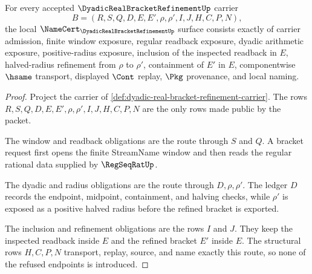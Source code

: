 \begin{theorem}
\label{thm:dyadic-real-bracket-refinement-namecert-obligations}
For every accepted $\DyadicRealBracketRefinementUp$ carrier
$$
B=(R,S,Q,D,E,E',\rho,\rho',I,J,H,C,P,N),
$$
the local $\NameCert_{\DyadicRealBracketRefinementUp}$ surface consists exactly of carrier admission, finite window exposure, regular readback exposure, dyadic arithmetic exposure, positive-radius exposure, inclusion of the inspected readback in $E$, halved-radius refinement from $\rho$ to $\rho'$, containment of $E'$ in $E$, componentwise $\hsame$ transport, displayed $\Cont$ replay, $\Pkg$ provenance, and local naming.
\end{theorem}
\begin{proof}
Project the carrier of \autoref{def:dyadic-real-bracket-refinement-carrier}. The rows $R,S,Q,D,E,E',\rho,\rho',I,J,H,C,P,N$ are the only rows made public by the packet.

The window and readback obligations are the route through $S$ and $Q$. A bracket request first opens the finite StreamName window and then reads the regular rational data supplied by $\RegSeqRatUp$.

The dyadic and radius obligations are the route through $D,\rho,\rho'$. The ledger $D$ records the endpoint, midpoint, containment, and halving checks, while $\rho'$ is exposed as a positive halved radius before the refined bracket is exported.

The inclusion and refinement obligations are the rows $I$ and $J$. They keep the inspected readback inside $E$ and the refined bracket $E'$ inside $E$. The structural rows $H,C,P,N$ transport, replay, source, and name exactly this route, so none of the refused endpoints is introduced.
\end{proof}

